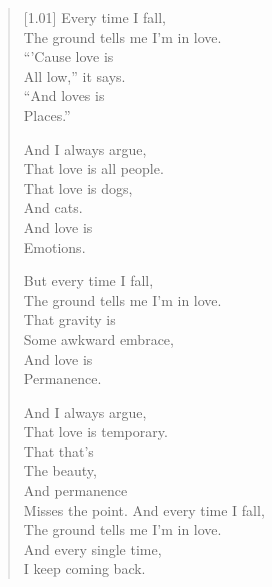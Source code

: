 \begin{verse}[1.01\textwidth]
Every time I fall,\\
\vin The ground tells me I'm in love.\\
``'Cause love is\\
\vin All low,'' it says.\\
``And loves is\\
\vin Places.''

And I always argue,\\
\vin That love is all people.\\
That love is dogs,\\
\vin And cats.\\
And love is\\
\vin Emotions.

But every time I fall,\\
\vin The ground tells me I'm in love.\\
That gravity is\\
\vin Some awkward embrace,\\
And love is\\
\vin Permanence.

\newpage

\null
\vspace{1cm}

And I always argue,\\
\vin That love is temporary.\\
That that's\\
\vin The beauty,\\
And permanence\\
\vin Misses the point.
And every time I fall,\\
\vin The ground tells me I'm in love.\\
And every single time,\\
\vin I keep coming back.
\end{verse}
